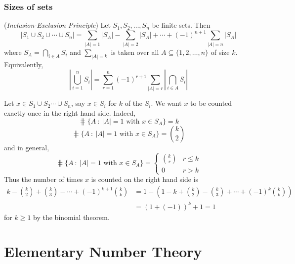 \documentclass[10pt, a4paper, twoside]{report}
\begin{document}
\subsubsection{Sizes of sets}
\begin{theorem}
    (\emph{Inclusion-Exclusion Principle}) Let \(S_1,S_2,\ldots,S_n\) be finite sets. Then 
    \[|S_1\cup S_2\cup\cdots\cup S_n|=\sum_{|A|=1}|S_A|-\sum_{|A|=2}|S_A|+\cdots+(-1)^{n+1}\sum_{|A|=n}|S_A|\]
    where \(S_A=\bigcap_{i\in A}S_i\) and \(\sum_{|A|=k}\) is taken over all \(A\subseteq\{1,2,\ldots,n\}\) of size \(k\). Equivalently, 
    \[\left|\bigcup_{i=1}^nS_i\right|=\sum_{r=1}^{n}(-1)^{r+1}\sum_{|A|=r}\left|\bigcap_{i\in A}S_i\right|\]
\end{theorem}
Let \(x\in S_1\cup S_2\cdots\cup S_n\), say \(x\in S_i\) for \(k\) of the \(S_i\). We want \(x\) to be counted exactly once in the right hand side. Indeed,
\[\hash\{A\::\:|A|=1\text{  with  }x\in S_A\}=k\]
\[\hash\{A\::\:|A|=1\text{  with  }x\in S_A\}=\binom k2\]
and in general,
\[\hash\{A\::\:|A|=1\text{  with  }x\in S_A\}=\begin{cases}
    \binom kr & r\leq k \\
    0 & r>k
\end{cases}\]
Thus the number of times \(x\) is counted on the right hand side is 
\begin{align*}
    k-\binom k2+\binom k3-\cdots+(-1)^{k+1}\binom kk &=1-\left(1-k+\binom k2-\binom k3+\cdots+(-1)^k\binom kk\right) \\
    &=(1+(-1))^k+1=1
\end{align*}
for \(k\geq 1\) by the binomial theorem.
\section{Elementary Number Theory}
\end{document}

